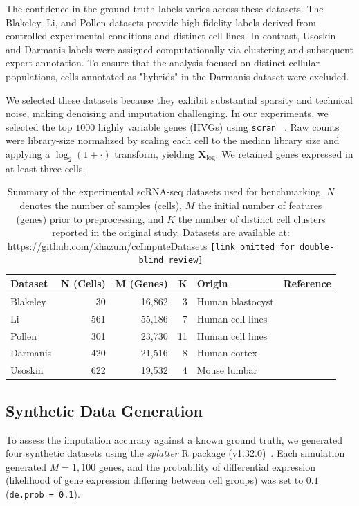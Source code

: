 \documentclass{article}
\theoremstyle{plain}
\theoremstyle{definition}
\theoremstyle{remark}
\newcommand{\ccimputedatasetslink}{%
  \ificmlshowauthors%
    \url{https://github.com/khazum/ccImputeDatasets}%
  \else%
    \texttt{[link omitted for double-blind review]}%
  \fi%
}
\begin{document}
The confidence in the ground-truth labels varies across these datasets. The Blakeley, Li, and Pollen datasets provide high-fidelity labels derived from controlled experimental conditions and distinct cell lines. In contrast, Usoskin and Darmanis labels were assigned computationally via clustering and subsequent expert annotation. To ensure that the analysis focused on distinct cellular populations, cells annotated as "hybrids" in the Darmanis dataset were excluded.

We selected these datasets because they exhibit substantial sparsity and technical noise, making denoising and imputation challenging. In our experiments, we selected the top $1000$ highly variable genes (HVGs) using \texttt{scran} ~\cite{lun2016step}. Raw counts were library-size normalized by scaling each cell to the median library size and applying a $\log_2(1+\cdot)$ transform, yielding $\mathbf{X}_{\log}$. We retained genes expressed in at least three cells.

\begin{table}[!ht]
\caption{Summary of the experimental scRNA-seq datasets used for benchmarking. $N$ denotes the number of samples (cells), $M$ the initial number of features (genes) prior to preprocessing, and $K$ the number of distinct cell clusters reported in the original study. Datasets are available at: \ccimputedatasetslink}
\label{tab:datasets}
\centering
\begin{tabular}{@{} l r r r l l @{}}
\toprule
\textbf{Dataset} & \textbf{N (Cells)} & \textbf{M (Genes)} & \textbf{K} & \textbf{Origin} & \textbf{Reference} \\
\midrule
Blakeley & 30 & 16,862 & 3 & Human blastocyst & \cite{blakeley2015defining} \\
Li & 561 & 55,186 & 7 & Human cell lines & \cite{li2017reference} \\
Pollen & 301 & 23,730 & 11 & Human cell lines & \cite{pollen2014low} \\
Darmanis & 420 & 21,516 & 8 & Human cortex & \cite{darmanis2015survey} \\
Usoskin & 622 & 19,532 & 4 & Mouse lumbar & \cite{usoskin2015unbiased} \\
\bottomrule
\end{tabular}
\end{table}

\subsection{Synthetic Data Generation}
\label{sec:synthetic_data}
To assess the imputation accuracy against a known ground truth, we generated four synthetic datasets using the \textit{splatter} R package (v1.32.0)~\cite{zappia2017splatter}. Each simulation generated $M=1{,}100$ genes, and the probability of differential expression (likelihood of gene expression differing between cell groups) was set to $0.1$ (\texttt{de.prob = 0.1}).
\end{document}
